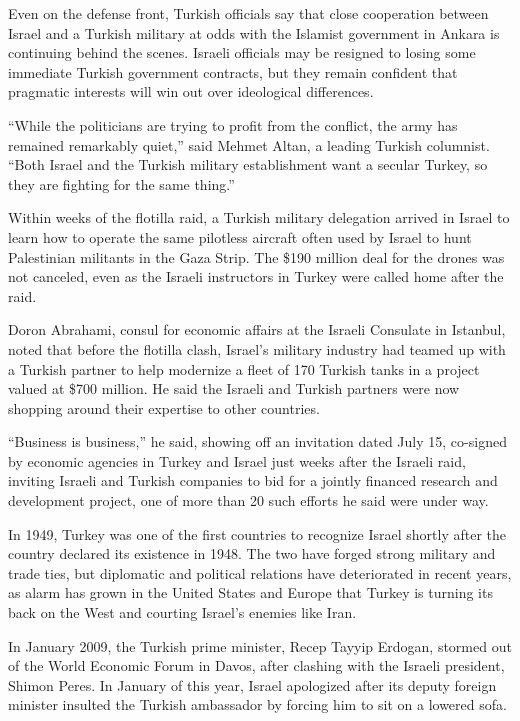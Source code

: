 ﻿\documentclass[12pt]{article}
\begin{document}
Even on the defense front, Turkish officials say that close cooperation between Israel and a Turkish
military at odds with the Islamist government in Ankara is continuing behind the scenes. Israeli
officials may be resigned to losing some immediate Turkish government contracts, but they remain
confident that pragmatic interests will win out over ideological differences.

``While the politicians are trying to profit from the conflict, the army has remained remarkably
quiet,'' said Mehmet Altan, a leading Turkish columnist. ``Both Israel and the Turkish military
establishment want a secular Turkey, so they are fighting for the same thing.''

Within weeks of the flotilla raid, a Turkish military delegation arrived in Israel to learn how to
operate the same pilotless aircraft often used by Israel to hunt Palestinian militants in the Gaza
Strip. The \$190 million deal for the drones was not canceled, even as the Israeli instructors in
Turkey were called home after the raid.

Doron Abrahami, consul for economic affairs at the Israeli Consulate in Istanbul, noted that before
the flotilla clash, Israel's military industry had teamed up with a Turkish partner to help
modernize a fleet of 170 Turkish tanks in a project valued at \$700 million. He said the Israeli and
Turkish partners were now shopping around their expertise to other countries.

``Business is business,'' he said, showing off an invitation dated July 15, co-signed by economic
agencies in Turkey and Israel just weeks after the Israeli raid, inviting Israeli and Turkish
companies to bid for a jointly financed research and development project, one of more than 20 such
efforts he said were under way.

In 1949, Turkey was one of the first countries to recognize Israel shortly after the country
declared its existence in 1948. The two have forged strong military and trade ties, but diplomatic
and political relations have deteriorated in recent years, as alarm has grown in the United States
and Europe that Turkey is turning its back on the West and courting Israel's enemies like Iran.

In January 2009, the Turkish prime minister, Recep Tayyip Erdogan, stormed out of the World Economic
Forum in Davos, after clashing with the Israeli president, Shimon Peres. In January of this year,
Israel apologized after its deputy foreign minister insulted the Turkish ambassador by forcing him
to sit on a lowered sofa.
\end{document}
